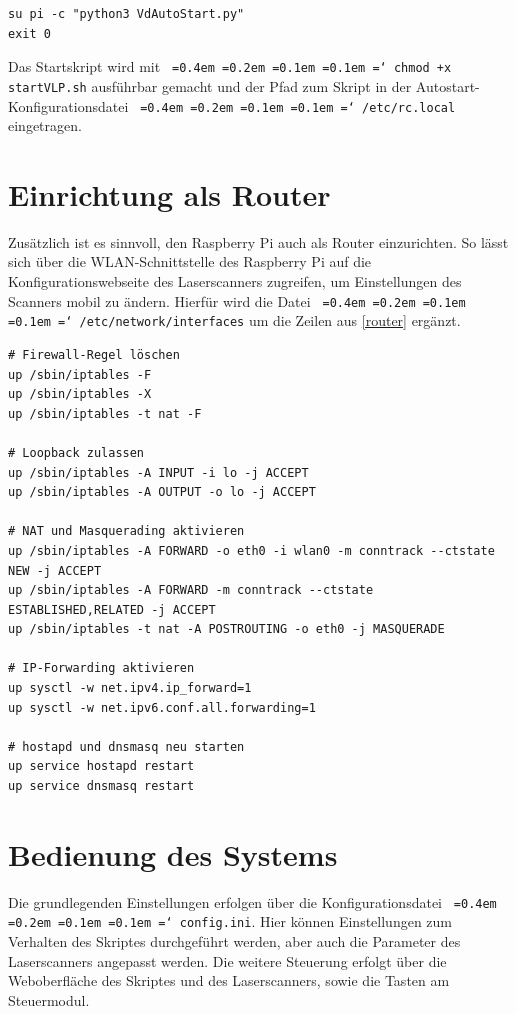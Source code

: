 \documentclass[a4paper,12pt,bibliography=totoc, listof=totoc,titlepage,pointlessnumbers]{scrreprt}
\newcommand*\justify{%
  \fontdimen2\font=0.4em%
  \fontdimen3\font=0.2em%
  \fontdimen4\font=0.1em%
  \fontdimen7\font=0.1em%
  \hyphenchar\font=`\-%
}
\newcommand{\code}[1]{\texttt{\justify{#1}}}
\begin{document}
\begin{lstlisting}[caption={Startskript startVLP.sh}, label={startskript}]
su pi -c "python3 VdAutoStart.py"
exit 0
\end{lstlisting}

Das Startskript wird mit \code{chmod +x startVLP.sh} ausführbar gemacht und der Pfad zum Skript in der Autostart-Konfigurationsdatei \code{/etc/rc.local} eingetragen. 




\section{Einrichtung als Router}
Zusätzlich ist es sinnvoll, den Rasp\-berry Pi auch als Router einzurichten. So lässt sich über die WLAN-Schnittstelle des Rasp\-berry Pi auf die Konfigurationswebseite des Laser\-scan\-ners zugreifen, um Einstellungen des Scanners mobil zu ändern. Hierfür wird die Datei \code{/etc/network/interfaces} um die Zeilen aus \autoref{router} ergänzt. \citep{ekRaspRouter}


\begin{lstlisting}[caption={Erweiterung der \code{/etc/network/interfaces} zur Nutzung als Router}, label={router}]
# Firewall-Regel löschen
up /sbin/iptables -F
up /sbin/iptables -X
up /sbin/iptables -t nat -F

# Loopback zulassen
up /sbin/iptables -A INPUT -i lo -j ACCEPT
up /sbin/iptables -A OUTPUT -o lo -j ACCEPT

# NAT und Masquerading aktivieren
up /sbin/iptables -A FORWARD -o eth0 -i wlan0 -m conntrack --ctstate NEW -j ACCEPT
up /sbin/iptables -A FORWARD -m conntrack --ctstate ESTABLISHED,RELATED -j ACCEPT
up /sbin/iptables -t nat -A POSTROUTING -o eth0 -j MASQUERADE

# IP-Forwarding aktivieren
up sysctl -w net.ipv4.ip_forward=1
up sysctl -w net.ipv6.conf.all.forwarding=1

# hostapd und dnsmasq neu starten
up service hostapd restart
up service dnsmasq restart
\end{lstlisting}

\section{Bedienung des Systems}
Die grundlegenden Einstellungen erfolgen über die Konfigurationsdatei \code{config.ini}. Hier können Einstellungen zum Verhalten des Skriptes durchgeführt werden, aber auch die Parameter des Laser\-scan\-ners angepasst werden. Die weitere Steuerung erfolgt über die Weboberfläche des Skriptes und des Laser\-scan\-ners, sowie die Tasten am Steuermodul.
\end{document}

